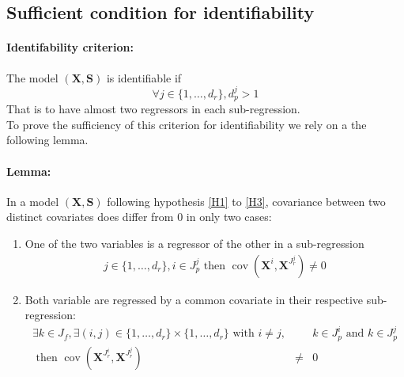 \documentclass[12pt,a4paper]{report}
\begin{document}
		\subsection{Sufficient condition for identifiability}

\paragraph{Identifability criterion:} The model $(\boldsymbol{X},\boldsymbol{S})$ is identifiable if
			\begin{equation}
				\forall j \in \{1,\dots,d_r\},  d_p^j>1\label{identcondition}
			\end{equation}
That is to have almost two regressors in each sub-regression.\\

To prove the sufficiency of this criterion for identifiability we rely on a the following lemma.

\paragraph{Lemma:} In a model $(\boldsymbol{X},\boldsymbol{S})$ following hypothesis \ref{H1} to \ref{H3}, covariance between two distinct covariates does differ from $0$ in only two cases:
\begin{enumerate}
	\item One of the two variables is a regressor of the other in a sub-regression	
	\begin{eqnarray}
		j \in \{1,\dots,d_r\}, i \in J_p^j \textrm{ then } \operatorname{cov}(\boldsymbol{X}^{i},\boldsymbol{X}^{J_r^j})\neq 0
	\end{eqnarray}
	\item Both variable are regressed by a common covariate in their respective sub-regression:
	\begin{eqnarray}
		\exists k \in J_f, \exists (i,j)\in \{1,\dots,d_r\}\times \{1,\dots,d_r\} \textrm{ with } i\neq j,&&  k\in J_p^i \textrm{ and } k\in J_p^j \\
		\textrm{ then } \operatorname{cov}(\boldsymbol{X}^{J_r^i},\boldsymbol{X}^{J_r^j})&\neq &0 \nonumber
	\end{eqnarray}
\end{enumerate}
\end{document}
